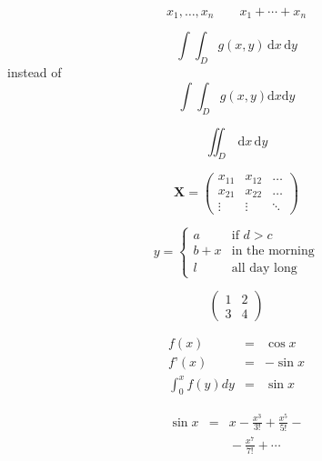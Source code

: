 \documentclass[a4paper,11pt,twocolumn]{article}
\begin{document}
\begin{spacing}{1.0}
\begin{displaymath}
x_{1},\ldots,x_{n} \qquad
x_{1}+\cdots+x_{n}
\end{displaymath}

\newcommand{\ud}{\mathrm{d}}
\begin{displaymath}
\int\!\!\!\int_{D} g(x,y)
\, \ud x\, \ud y
\end{displaymath}
instead of
\begin{displaymath}
\int\int_{D} g(x,y)\ud x \ud y
\end{displaymath}

\begin{displaymath}
\iint_{D} \, \ud x \, \ud y
\end{displaymath}

\begin{displaymath}
\mathbf{X} =
\left( \begin{array}{ccc}
x_{11} & x_{12} & \ldots \\
x_{21} & x_{22} & \ldots \\
\vdots & \vdots & \ddots
\end{array} \right)
\end{displaymath}

\begin{displaymath}
y = \left\{ \begin{array}{ll}
a & \textrm{if $d>c$}\\
b+x & \textrm{in the morning}\\
l & \textrm{all day long}
\end{array} \right.
\end{displaymath}

\begin{displaymath}
\left(\begin{array}{c|c}
1 & 2 \\
\hline
3 & 4
\end{array}\right)
\end{displaymath}

\begin{eqnarray}
f(x) & = & \cos x \\
f’(x) & = & -\sin x \\
\int_{0}^{x} f(y)dy &
= & \sin x
\end{eqnarray}

{\setlength\arraycolsep{2pt}
\begin{eqnarray}
\sin x & = & x -\frac{x^{3}}{3!}
+\frac{x^{5}}{5!}-{}
\nonumber\\
& & {}-\frac{x^{7}}{7!}+{}\cdots
\end{eqnarray}}


\end{spacing}
\end{document}
